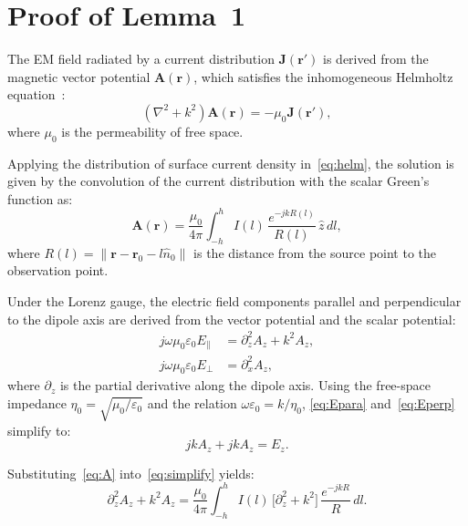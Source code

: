 \documentclass[journal]{IEEEtran}
\begin{document}
\appendices
\section{Proof of Lemma~1}
\label{app:lemma1}

The EM field radiated by a current distribution $\mathbf{J}(\mathbf{r}')$ is derived from the magnetic vector potential $\mathbf{A}(\mathbf{r})$, which satisfies the inhomogeneous Helmholtz equation~\cite{ref31}:
\begin{equation}
    (\nabla^2 + k^2)\mathbf{A}(\mathbf{r}) = -\mu_0\mathbf{J}(\mathbf{r}'),
    \label{eq:helm}
\end{equation}
where $\mu_0$ is the permeability of free space.

Applying the distribution of surface current density in~\eqref{eq:helm}, the solution is given by the convolution of the current distribution with the scalar Green's function as:
\begin{equation}
    \mathbf{A}(\mathbf{r}) = \frac{\mu_0}{4\pi}\int_{-h}^{h} I(l)\,\frac{e^{-jkR(l)}}{R(l)}\,\hat{z}\,dl,
    \label{eq:A}
\end{equation}
where $R(l) = \|\mathbf{r} - \mathbf{r}_0 - l\hat{n}_0\|$ is the distance from the source point to the observation point.

Under the Lorenz gauge, the electric field components parallel and perpendicular to the dipole axis are derived from the vector potential and the scalar potential:
\begin{align}
    j\omega\mu_0\varepsilon_0 E_\parallel &= \partial_z^2 A_z + k^2 A_z, \label{eq:Epara} \\
    j\omega\mu_0\varepsilon_0 E_\perp &= \partial_x^2 A_z, \label{eq:Eperp}
\end{align}
where $\partial_z$ is the partial derivative along the dipole axis. Using the free-space impedance $\eta_0 = \sqrt{\mu_0/\varepsilon_0}$ and the relation $\omega\varepsilon_0 = k/\eta_0$, \eqref{eq:Epara} and~\eqref{eq:Eperp} simplify to:
\begin{equation}
    jkA_z + jkA_z = E_z. \label{eq:simplify}
\end{equation}

Substituting~\eqref{eq:A} into~\eqref{eq:simplify} yields:
\begin{equation}
    \partial_z^2 A_z + k^2 A_z = \frac{\mu_0}{4\pi}\int_{-h}^{h} I(l)\,\bigl[\partial_z^2 + k^2\bigr]\,\frac{e^{-jkR}}{R}\,dl.
    \label{eq:integ}
\end{equation}
\end{document}
